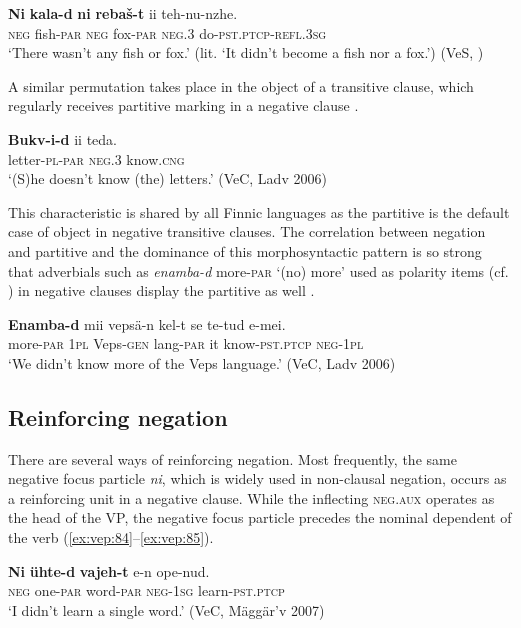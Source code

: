 \documentclass[output=paper,colorlinks=true, citecolor=brown]{langscibook}
\begin{document}
\ea
    \label{ex:vep:81}
    \gll \textbf{Ni} \textbf{kala{}-d} \textbf{ni} \textbf{rebaš{}-t} ii teh-nu{}-nzhe. \\
         \textsc{neg}  fish-\textsc{par} \textsc{neg}  fox-\textsc{par} \textsc{neg.3} do-\textsc{pst.ptcp}{}-\textsc{refl}.\textsc{3sg}\\
    \glt ‘There wasn’t any fish or fox.’ (lit. ‘It didn’t become a fish nor a fox.’) (VeS, \citealt[440]{MSFOu86})
\z 

A similar permutation takes place in the object of a transitive clause, which regularly receives partitive marking in a negative clause .

\ea
    \label{ex:vep:82}
    \gll \textbf{Bukv-i-d} ii teda. \\
         letter{}-\textsc{pl}{}-\textsc{par} \textsc{neg.3} know.\textsc{cng}\\
    \glt ‘(S)he doesn’t know (the) letters.’ (VeC, Ladv 2006)
\z 

This characteristic is shared by all Finnic languages as the partitive is the default case of object in negative transitive clauses. The correlation between negation and partitive and the dominance of this morphosyntactic pattern is so strong that adverbials such as \textit{enamba-d} more-\textsc{par} ‘(no) more’ used as polarity items (cf. ) in negative clauses display the partitive as well .

\ea
    \label{ex:vep:83}
    \gll \textbf{Enamba-d} mii vepsä-n kel-t se  te-tud  e-mei.\\
         more-\textsc{par} \textsc{1pl} Veps-\textsc{gen} lang-\textsc{par} it  know-\textsc{pst.ptcp} \textsc{neg-1pl}\\
    \glt ‘We didn’t know more of the Veps language.’ (VeC, Ladv 2006)
\z 

\subsection{Reinforcing negation}\label{sec:vep:4.4}

There are several ways of reinforcing negation. Most frequently, the same negative focus particle \textit{ni}, which is widely used in non-clausal negation, occurs as a reinforcing unit in a negative clause. While the inflecting \textsc{neg}.\textsc{aux} operates as the head of the VP, the negative focus particle precedes the nominal dependent of the verb (\ref{ex:vep:84}–\ref{ex:vep:85}). 

\ea\label{ex:vep:84} 
    \gll  \textbf{Ni} \textbf{ühte{}-d} \textbf{vajeh{}-t} e{}-n ope{}-nud.\\ 
          \textsc{neg} {one-}{\textsc{par}} {word-}{\textsc{par}} \textsc{neg-1sg} {learn-}\textsc{pst.ptcp}\\
    \glt ‘I didn’t learn a single word.’ (VeC, Mäggär’v 2007)
\z 
\end{document}
